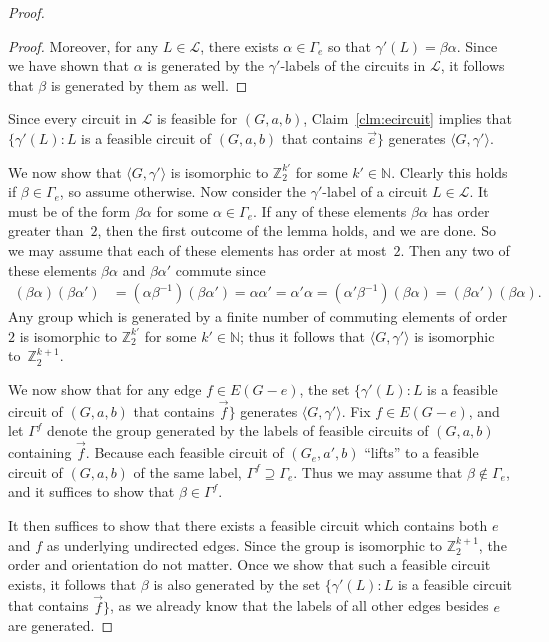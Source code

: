 \documentclass[a4paper, 12pt]{article}
\begin{document}
\begin{proof}
\begin{proof}
        Moreover, for any $L \in \mathcal{L}$, there exists $\alpha \in \Gamma_e$ so that $\gamma'(L)=\beta\alpha$. Since we have shown that $\alpha$ is generated by the $\gamma'$-labels of the circuits in $\mathcal{L}$, it follows that $\beta$ is generated by them as well.
    \end{proof}

    Since every circuit in $\mathcal{L}$ is feasible for $(G, a, b)$, Claim~\ref{clm:ecircuit} implies that $\{\gamma'(L): L$ is a feasible circuit of $(G, a, b)$ that contains $\vec{e}\}$ generates $\langle G, \gamma'\rangle$.

    We now show that $\langle G, \gamma'\rangle$ is isomorphic to $\mathbb{Z}_2^{k'}$ for some $k' \in \mathbb{N}$. Clearly this holds if $\beta \in \Gamma_e$, so assume otherwise. Now consider the $\gamma'$-label of a circuit $L \in \mathcal{L}$. It must be of the form $\beta\alpha$ for some $\alpha \in \Gamma_e$. If any of these elements $\beta\alpha$ has order greater than~$2$, then the first outcome of the lemma holds, and we are done. So we may assume that each of these elements has order at most~$2$. Then any two of these elements $\beta\alpha$ and $\beta\alpha'$ commute since
        \begin{align*}
        (\beta\alpha)(\beta\alpha') &= (\alpha\beta^{-1})(\beta\alpha')
        = \alpha\alpha'
        =\alpha'\alpha
        = (\alpha'\beta^{-1})(\beta\alpha)
        = (\beta\alpha')(\beta\alpha).
        \end{align*}
    Any group which is generated by a finite number of commuting elements of order $2$ is isomorphic to $\mathbb{Z}_2^{k'}$ for some $k' \in \mathbb{N}$; thus it follows that $\langle G, \gamma'\rangle$ is isomorphic to~$\mathbb{Z}_2^{k+1}$.

    We now show that for any edge $f \in E(G - e)$, the set $\{\gamma'(L) : L$ is a feasible circuit of $(G,a,b)$ that contains $\vec{f}\}$ generates $\langle G,\gamma'\rangle$. Fix $f \in E(G - e)$, and let $\Gamma^f$ denote the group generated by the labels of feasible circuits of $(G,a,b)$ containing $\vec{f}$. Because each feasible circuit of $(G_e, a', b)$ ``lifts'' to a feasible circuit of $(G, a, b)$ of the same label, $\Gamma^f \supseteq \Gamma_e$. Thus we may assume that $\beta \not\in \Gamma_e$, and it suffices to show that $\beta \in \Gamma^f$.

    It then suffices to show that there exists a feasible circuit which contains both $e$ and $f$ as underlying undirected edges. Since the group is isomorphic to $\mathbb{Z}_2^{k+1}$, the order and orientation do not matter. Once we show that such a feasible circuit exists, it follows that $\beta$ is also generated by the set $\{\gamma'(L): L$ is a feasible circuit that contains $\vec{f}\}$, as we already know that the labels of all other edges besides $e$ are generated.
    

\end{proof}
\end{document}
